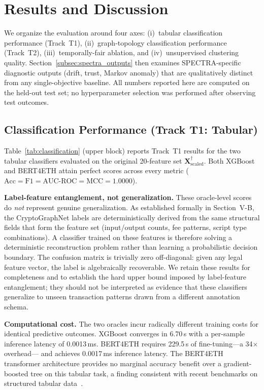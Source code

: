 \documentclass[journal]{IEEEtran}
\begin{document}
\section{Results and Discussion}
\label{sec:results}

We organize the evaluation around four axes:
(i)~tabular classification performance (Track~T1),
(ii)~graph-topology classification performance (Track~T2),
(iii)~temporally-fair ablation, and
(iv)~unsupervised clustering quality.
Section~\ref{subsec:spectra_outputs} then examines SPECTRA-specific
diagnostic outputs (drift, trust, Markov anomaly) that are qualitatively
distinct from any single-objective baseline.
All numbers reported here are computed on the held-out test set;
no hyperparameter selection was performed after observing test outcomes.


\subsection{Classification Performance (Track T1: Tabular)}
\label{subsec:t1_results}

Table~\ref{tab:classification} (upper block) reports Track~T1 results for
the two tabular classifiers evaluated on the original \num{20}-feature set
$\mathbf{X}^{\dagger}_{\text{scaled}}$.
Both XGBoost and BERT4ETH attain perfect scores across every metric
($\text{Acc} = \text{F1} = \text{AUC-ROC} = \text{MCC} = \num{1.0000}$).

\textbf{Label-feature entanglement, not generalization.}
These oracle-level scores do \emph{not} represent genuine generalization.
As established formally in Section~V-B, the CryptoGraphNet labels are
deterministically derived from the same structural fields that form the
feature set (input/output counts, fee patterns, script type combinations).
A classifier trained on these features is therefore solving a
deterministic reconstruction problem rather than learning a probabilistic
decision boundary.
The confusion matrix is trivially zero off-diagonal: given any legal feature
vector, the label is algebraically recoverable.
We retain these results for completeness and to establish the hard upper
bound imposed by label-feature entanglement; they should not be interpreted
as evidence that these classifiers generalize to unseen transaction patterns
drawn from a different annotation schema.

\textbf{Computational cost.}
The two oracles incur radically different training costs for identical
predictive outcomes.
XGBoost converges in \num{6.70}\,s with a per-sample inference latency
of \num{0.0013}\,ms.
BERT4ETH requires \num{229.5}\,s of fine-tuning---a \num{34}$\times$ overhead---
and achieves \num{0.0017}\,ms inference latency.
The BERT4ETH transformer architecture provides no marginal accuracy benefit
over a gradient-boosted tree on this tabular task, a finding consistent with
recent benchmarks on structured tabular data~\cite{Grinsztajn2022}.
\end{document}
